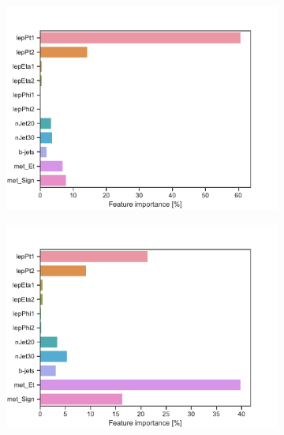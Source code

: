 \begin{figure}[H]
    \centering
    \begin{subfigure}[t!]{0.49\textwidth}
        \includegraphics[width = \textwidth]{Figures/SlepSlep/ML/BDT/Low_level/High/featureImportance.pdf}
        \caption{}
        \label{fig:traintestscaled}
    \end{subfigure}
    \begin{subfigure}[t!]{0.49\textwidth}
        \includegraphics[width = \textwidth]{Figures/SlepSnu/BDT/Low_level/High/featureImportance.pdf}
        \caption{}
        \label{fig:ROCBDTLow_low_level}
    \end{subfigure}
    \begin{subfigure}[t!]{0.49\textwidth}

\end{subfigure}
\end{figure}

